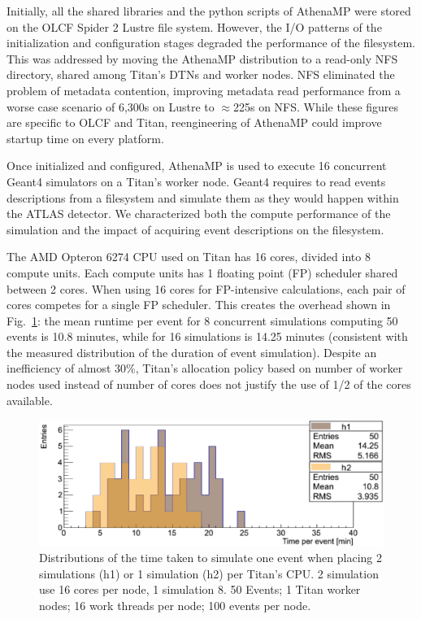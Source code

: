 Initially, all the shared libraries and the python scripts of AthenaMP were
stored on the OLCF Spider 2 Lustre file system. However, the I/O patterns of
the initialization and configuration stages degraded the performance of the
filesystem. This was addressed by moving the AthenaMP distribution to a
read-only NFS directory, shared among Titan's DTNs and worker nodes. NFS
eliminated the problem of metadata contention, improving metadata read
performance from a worse case scenario of 6,300s on Lustre to \(\approx\)225s
on NFS\@. While these figures are specific to OLCF and Titan, reengineering
of AthenaMP could improve startup time on every platform.

Once initialized and configured, AthenaMP is used to execute 16 concurrent
Geant4 simulators on a Titan's worker node. Geant4 requires to read events
descriptions from a filesystem and simulate them as they would happen within
the ATLAS detector. We characterized both the compute performance of the
simulation and the impact of acquiring event descriptions on the filesystem.

The AMD Opteron 6274 CPU used on Titan has 16 cores, divided into 8 compute
units. Each compute units has 1 floating point (FP) scheduler shared between
2 cores. When using 16 cores for FP-intensive calculations, each pair of
cores competes for a single FP scheduler. This creates the overhead shown in
Fig.~\ref{fig:comparison-8-16cores}: the mean runtime per event for 8
concurrent simulations computing 50 events is 10.8 minutes, while for 16
simulations is 14.25 minutes (consistent with the measured distribution of
the duration of event simulation). Despite an inefficiency of almost 30\%,
Titan's allocation policy based on number of worker nodes used instead of
number of cores does not justify the use of 1/2 of the cores available.

\begin{figure}[htp]
    \includegraphics[clip,width=\columnwidth]{tx8_tx16_comparison_vsquashed.pdf}
    \vspace{-0.3in}
    \caption{Distributions of the time taken to simulate one event when
    placing 2 simulations (h1) or 1 simulation (h2) per Titan's CPU\@. 2
    simulation use 16 cores per node, 1 simulation 8. 50 Events; 1 Titan
    worker nodes; 16 work threads per node; 100 events per
    node.}\label{fig:comparison-8-16cores}
\end{figure}

